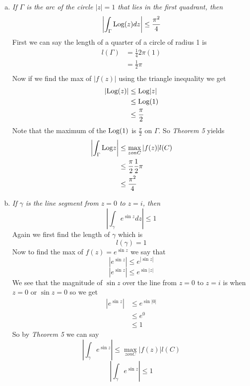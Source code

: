 \documentclass[11pt]{article}
\newcommand{\Log}{\textnormal{Log}}
\begin{document}
\begin{enumerate}
\begin{enumerate}[(a)]
\item
\textit{If $\Gamma$ is the arc of the circle $|z| =1$ that lies in the first quadrant, then}
$$\left|\int_{\Gamma} \Log(z)dz\right| \le \frac{\pi^{2}}{4}$$
First we can say the length of a quarter of a circle of radius 1 is
\begin{align*}
l(\Gamma) &= \frac{1}{4}2\pi(1)\\
&= \frac{1}{2}\pi\\
\end{align*}
Now if we find the max of $|f(z)|$ using the triangle inequality we get
\begin{align*}
|\Log(z)| &\le \Log|z|\\
&\le \Log(1)\\
&\le \frac{\pi}{2}
\end{align*}
Note that the maximum of the $\Log(1)$ is $\frac{\pi}{2}$ on $\Gamma$. So \emph{Theorem 5} yields
\begin{align*}
\left|\int_{\Gamma}\Log z\right| &\le \max_{z on C}|f(z)|l(C)\\
 &\le \frac{\pi}{2}\frac{1}{2}\pi\\
 &\le \frac{\pi^2}{4}
\end{align*}

\item
\textit{If $\gamma$ is the line segment from $z=0$ to $z=i$, then}
$$\left|\int_{\gamma} e^{\sin z}dz\right| \le 1$$
Again we first find the length of $\gamma$ which is
$$l(\gamma) = 1$$
Now to find the max of $f(z) = e^{\sin z}$ we say that
$$|e^{\sin z}| \le e^{|\sin z|}$$ 
$$|e^{\sin z}| \le e^{\sin |z|}$$ 
We see that the magnitude of $\sin z$ over the line from $z=0$ to $z=i$ is when $z=0$ or $\sin z = 0$ so we get
\begin{align*}
|e^{\sin z}| &\le e^{\sin |0|}\\ 
&\le e^{0}\\ 
&\le 1 
\end{align*}
So by \emph{Theorem 5} we can say 
$$\left|\int_{\gamma}e^{\sin z}\right|\le \max_{z on C}|f(z)|l(C)$$
$$\left|\int_{\gamma}e^{\sin z}\right|\le 1$$
\end{enumerate}


\end{enumerate}
\end{document}
